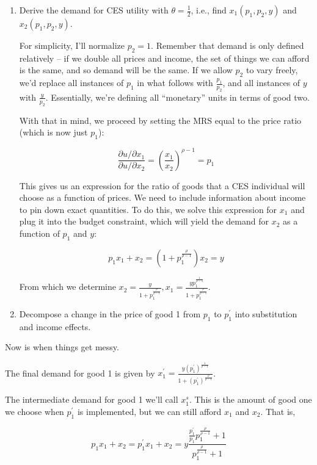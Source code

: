 \documentclass{article}
\begin{document}
\begin{enumerate}
\item Derive the demand for CES utility with $\theta = \frac12$, i.e., find $x_1(p_1, p_2, y)$ and $x_2(p_1, p_2, y)$.

\color{red}
For simplicity, I'll normalize $p_2 = 1$. Remember that demand is only defined relatively -- if we double all prices and income, the set of things we can afford is the same, and so demand will be the same. If we allow $p_2$ to vary freely, we'd replace all instances of $p_1$ in what follows with $\frac{p_1}{p_2}$, and all instances of $y$ with $\frac{y}{p_2}$. Essentially, we're defining all ``monetary'' units in terms of good two.

With that in mind, we proceed by setting the MRS equal to the price ratio (which is now just $p_1$):

\[ \frac{\partial u / \partial x_1}{\partial u / \partial x_2} = \left( \frac{x_1}{x_2} \right)^{\rho - 1} = p_1 \]

This gives us an expression for the ratio of goods that a CES individual will choose as a function of prices. We need to include information about income to pin down exact quantities. To do this, we solve this expression for $x_1$ and plug it into the budget constraint, which will yield the demand for $x_2$ as a function of $p_1$ and $y$:

\[ p_1 x_1 + x_2 = \left(1 + p_1^{\frac{\rho}{\rho - 1}} \right) x_2 = y \]

From which we determine $x_2 = \frac{y}{1 + p_1^{\frac{\rho}{\rho - 1}}}, x_1 = \frac{y p_1^{\frac1{\rho - 1}}}{1 + p_1^{\frac{\rho}{\rho - 1}}}$.
 
\color{black}

\item Decompose a change in the price of good 1 from $p_1$ to $p_1^{'}$ into substitution and income effects.
\end{enumerate}

\color{red} 

Now is when things get messy.

The final demand for good 1 is given by $x_1^{'} = \frac{y \left( p_1^{'} \right)^{\frac1{\rho - 1}}}{1 + \left( p_1^{'} \right)^{\frac{\rho}{\rho - 1}}}$.

The intermediate demand for good 1 we'll call $x_1^s$. This is the amount of good one we choose when $p_1^{'}$ is implemented, but we can still afford $x_1$ and $x_2$. That is,

\[ p_1 x_1 + x_2 = p_1^{'} x_1 + x_2 = y\frac{\frac{p_1^{'}}{p_1}p_1^{\frac{\rho}{\rho - 1}} + 1}{p_1^{\frac{\rho}{\rho - 1}} + 1}\]
\end{document}
